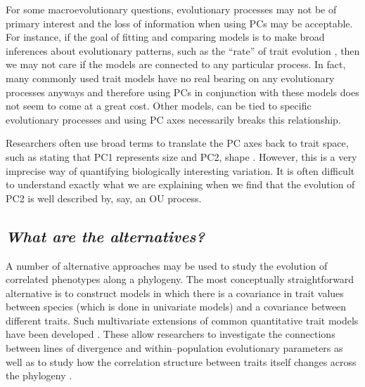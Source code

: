\documentclass[a4paper,11pt]{article}
\begin{document}
For some macroevolutionary questions, evolutionary processes may not be of primary interest and the loss of information when using PCs may be acceptable. For instance, if the goal of fitting and comparing models is to make broad inferences about evolutionary patterns, such as the ``rate'' of trait evolution \citep{Hunt2012}, then we may not care if the models are connected to any particular process. In fact, many commonly used trait models \citep[such as the $\lambda\text{, }\delta\text{, }\text{and }\kappa$ tree transformations;][]{Pagel1997, Pagel1999} have no real bearing on any evolutionary processes anyways \citep{HansenOrzack2005} and therefore using PCs in conjunction with these models does not seem to come at a great cost. Other models, can be tied to specific evolutionary processes \citep{HansenMartins1996, EstesArnold2007, Hansen2008, Hansen2012SysBio, PennellHarmon, PennellPE} and using PC axes necessarily breaks this relationship.

Researchers often use broad terms to translate the PC axes back to trait space, such as stating that PC1 represents size and PC2, shape \citep[e.g.,][]{Harmon2010, Price2014}. However, this is a very imprecise way of quantifying biologically interesting variation. It is often difficult to understand exactly what we are explaining when we find that the evolution of PC2 is well described by, say, an OU process.  

\subsection{\emph{What are the alternatives?}}

A number of alternative approaches may be used to study the evolution of correlated phenotypes along a phylogeny. The most conceptually straightforward alternative is to construct models in which there is a covariance in trait values between species (which is done in univariate models) and a covariance between different traits. Such multivariate extensions of common quantitative trait models have been developed \citep{ButlerKing2004, RevellHarmon2008, Hohenlohe2008, RevellCollar2009, motmot}. These allow researchers to investigate the connections between lines of divergence and within--population evolutionary parameters \citep{Hohenlohe2008} as well as to study how the correlation structure between traits itself changes across the phylogeny \citep{RevellCollar2009}. 
\end{document}
